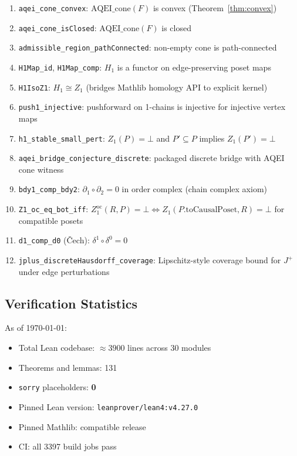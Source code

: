 \documentclass[12pt]{article}
\begin{document}
\begin{enumerate}
    \item \texttt{aqei\_cone\_convex}: $\mathrm{AQEI\_cone}(F)$ is convex
          (Theorem~\ref{thm:convex})
    \item \texttt{aqei\_cone\_isClosed}: $\mathrm{AQEI\_cone}(F)$ is closed
    \item \texttt{admissible\_region\_pathConnected}: non-empty cone is path-connected
    \item \texttt{H1Map\_id}, \texttt{H1Map\_comp}: $H_1$ is a functor on
          edge-preserving poset maps
    \item \texttt{H1IsoZ1}: $H_1 \cong Z_1$ (bridges Mathlib homology API
          to explicit kernel)
    \item \texttt{push1\_injective}: pushforward on 1-chains is injective
          for injective vertex maps
    \item \texttt{h1\_stable\_small\_pert}: $Z_1(P)=\bot$ and
          $P'\subseteq P$ implies $Z_1(P')=\bot$
    \item \texttt{aqei\_bridge\_conjecture\_discrete}: packaged discrete
          bridge with AQEI cone witness
    \item \texttt{bdy1\_comp\_bdy2}: $\partial_1\circ\partial_2=0$ in order
          complex (chain complex axiom)
    \item \texttt{Z1\_oc\_eq\_bot\_iff}: $Z_1^{\mathrm{oc}}(R,P)=\bot
          \iff Z_1(P.\mathrm{toCausalPoset}, R)=\bot$ for compatible posets
    \item \texttt{d1\_comp\_d0} (\v{C}ech): $\delta^1\circ\delta^0=0$
    \item \texttt{jplus\_discreteHausdorff\_coverage}: Lipschitz-style
          coverage bound for $J^+$ under edge perturbations
\end{enumerate}

\subsection{Verification Statistics}

As of \today:

\begin{itemize}
    \item Total Lean codebase: $\approx 3900$ lines across 30 modules
    \item Theorems and lemmas: 131
    \item \texttt{sorry} placeholders: \textbf{0}
    \item Pinned Lean version: \texttt{leanprover/lean4:v4.27.0}
    \item Pinned Mathlib: compatible release
    \item CI: all 3397 build jobs pass
\end{itemize}
\end{document}
